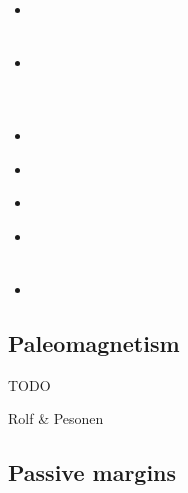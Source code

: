 \begin{scriptsize}
\begin{itemize}
\textcite{nacl09}\\
\textcite{kalb09}\\
\item[\twothousandten] 
\textcite{bepo10}\\
\textcite{yosh10}\\
\item[\twothousandtwelve] 
\textcite{nalr12}\\
\textcite{ghho12}\\
\textcite{wagw12}\\
\item[\twothousandthirteen] 
\textcite{ghhw13}\\
\item[\twothousandfourteen] 
\textcite{vagw14}\\
\item[\twothousandseventeen] 
\textcite{grrb17}\\
\item[\twothousandeighteen] 
\textcite{osss18} \\
\textcite{magu18}\\
\item[\twothousandnineteen] 
\textcite{tamg19}\\
\end{itemize}
\end{scriptsize}


\subsection{Paleomagnetism} 

TODO

Rolf \& Pesonen \cite{rope18}



\subsection{Passive margins} 

